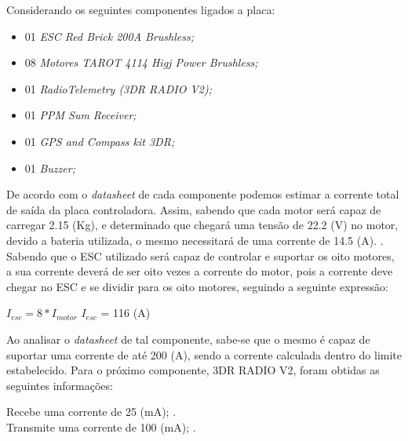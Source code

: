 	Considerando os seguintes componentes ligados a placa:

	\begin{itemize}

		\item 01 \textit{ESC Red Brick 200A Brushless;}
		
		\item 08 \textit{Motores TAROT 4114 Higj Power Brushless; }
		
		\item 01 \textit{RadioTelemetry (3DR RADIO V2);}
		
		\item 01 \textit{PPM Sum Receiver;}
		
		\item 01 \textit{GPS and Compass kit 3DR; }
		
		\item 01 \textit{Buzzer;}

	\end{itemize}

	De acordo com o \textit{datasheet} de cada componente podemos estimar a corrente total de saída da placa controladora. 
	Assim, sabendo que cada motor será capaz de carregar 2.15 (Kg), e determinado que chegará uma tensão de 22.2 (V) no motor, 
	devido a bateria utilizada, o mesmo necessitará de uma corrente de 14.5 (A). \cite{helipal}.
	Sabendo que o ESC utilizado será capaz de controlar e suportar os oito motores, a sua corrente deverá de ser oito vezes a 
	corrente do motor, pois a corrente deve chegar no ESC e se dividir para os oito motores, seguindo a seguinte expressão: 

	\begin{center}
 
	$I_{esc} = 8*I_{motor}$
	$I_{esc}$ = 116 (A)
	
	\end{center}

	Ao analisar o \textit{datasheet} de tal componente, sabe-se que o mesmo é capaz de suportar uma corrente de até 200 (A), 
	sendo a corrente calculada dentro do limite estabelecido.\footnotemark
	Para o próximo componente, 3DR RADIO V2, foram obtidas as seguintes informações: 
	
	\indent Recebe uma corrente de 25 (mA); \cite{radio}.\\
	\indent Transmite uma corrente de 100 (mA); \cite{radio}. 
	
